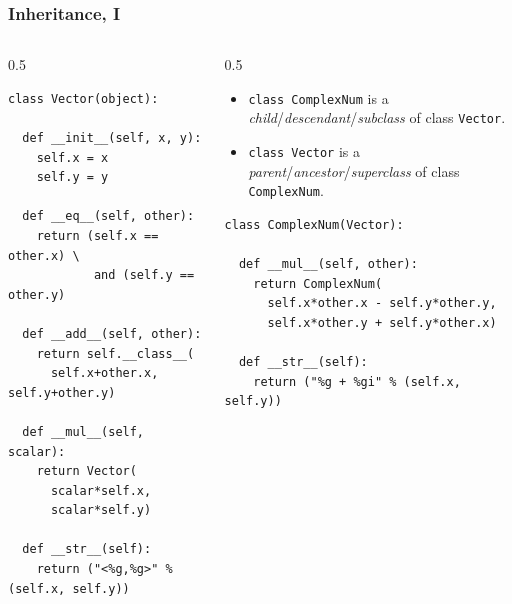 \begin{frame}[fragile]\frametitle{Inheritance, I}

  \begin{columns}[t]
    \begin{column}{0.5\linewidth}
\begin{lstlisting}[basicstyle=\tiny\ttfamily,showstringspaces=false]
class Vector(object):

  def __init__(self, x, y):
    self.x = x
    self.y = y

  def __eq__(self, other):
    return (self.x == other.x) \
            and (self.y == other.y)

  def __add__(self, other):
    return self.__class__(
      self.x+other.x, self.y+other.y)

  def __mul__(self, scalar):
    return Vector(
      scalar*self.x,
      scalar*self.y)

  def __str__(self):
    return ("<%g,%g>" % (self.x, self.y))
\end{lstlisting}
    \end{column}
    \begin{column}{0.5\linewidth}
\begin{itemize}
\item  \texttt{class ComplexNum} is a
      \emph{child}/\emph{descendant}/\emph{subclass} of class \texttt{Vector}.

\item
       \texttt{class Vector} is a
      \emph{parent}/\emph{ancestor}/\emph{superclass} of class
      \texttt{ComplexNum}.
\end{itemize}
\begin{lstlisting}[basicstyle=\tiny\ttfamily,showstringspaces=false]
class ComplexNum(Vector):

  def __mul__(self, other):
    return ComplexNum(
      self.x*other.x - self.y*other.y,
      self.x*other.y + self.y*other.x)

  def __str__(self):
    return ("%g + %gi" % (self.x, self.y))
\end{lstlisting}

    \end{column}
  \end{columns}

\end{frame}

